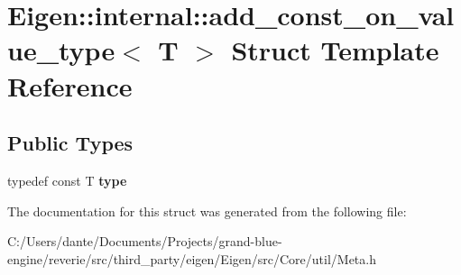 \hypertarget{struct_eigen_1_1internal_1_1add__const__on__value__type}{}\section{Eigen\+::internal\+::add\+\_\+const\+\_\+on\+\_\+value\+\_\+type$<$ T $>$ Struct Template Reference}
\label{struct_eigen_1_1internal_1_1add__const__on__value__type}
\subsection*{Public Types}
\begin{DoxyCompactItemize}
\item 
\mbox{\label{struct_eigen_1_1internal_1_1add__const__on__value__type_a7e1901ec0dabdc36b5458664d354d35a}} 
typedef const T {\bfseries type}
\end{DoxyCompactItemize}


The documentation for this struct was generated from the following file\+:\begin{DoxyCompactItemize}
\item 
C\+:/\+Users/dante/\+Documents/\+Projects/grand-\/blue-\/engine/reverie/src/third\+\_\+party/eigen/\+Eigen/src/\+Core/util/Meta.\+h\end{DoxyCompactItemize}
